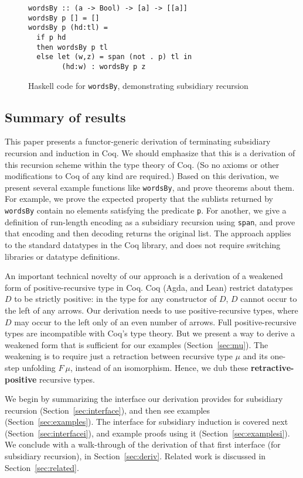 \documentclass[a4paper,USenglish]{lipics-v2021}
\begin{document}
\begin{figure}
\begin{verbatim}
wordsBy :: (a -> Bool) -> [a] -> [[a]]
wordsBy p [] = []
wordsBy p (hd:tl) =
  if p hd
  then wordsBy p tl 
  else let (w,z) = span (not . p) tl in
        (hd:w) : wordsBy p z
\end{verbatim}
\caption{Haskell code for \texttt{wordsBy}, demonstrating subsidiary recursion}
\label{fig:wordsBy}
\end{figure}

\subsection{Summary of results}

This paper presents a functor-generic derivation of terminating
subsidiary recursion and induction in Coq.  We should emphasize that
this is a derivation of this recursion scheme within the type theory
of Coq.  (So no axioms or other modifications to Coq of any kind are
required.) Based on this derivation, we present several example
functions like \verb|wordsBy|, and prove theorems about them.  For
example, we prove the expected property that the sublists returned by
\verb|wordsBy| contain no elements satisfying the predicate \verb|p|.
For another, we give a definition of run-length encoding as a
subsidiary recursion using \verb|span|, and prove that encoding and
then decoding returns the original list.  The approach applies to the
standard datatypes in the Coq library, and does not require switching
libraries or datatype definitions.

An important technical novelty of our approach is a derivation of a
weakened form of positive-recursive type in Coq.  Coq (Agda, and Lean)
restrict datatypes $D$ to be strictly positive: in the type for any
constructor of $D$, $D$ cannot occur to the left of any arrows.  Our
derivation needs to use positive-recursive types, where $D$ may occur
to the left only of an even number of arrows.  Full positive-recursive
types are incompatible with Coq's type theory.  But we present a way
to derive a weakened form that is sufficient for our examples
(Section~\ref{sec:mu}).  The weakening is to require just a retraction
between recursive type $\mu$ and its one-step unfolding $F\ \mu$,
instead of an isomorphism.  Hence, we dub these
\textbf{retractive-positive} recursive types.

We begin by summarizing the interface our derivation provides for
subsidiary recursion (Section~\ref{sec:interface}), and then see
examples (Section~\ref{sec:examples}).  The interface for subsidiary
induction is covered next (Section~\ref{sec:interfacei}), and example
proofs using it (Section~\ref{sec:examplesi}).  We conclude with a
walk-through of the derivation of that first interface (for subsidiary
recursion), in Section~\ref{sec:deriv}.  Related work is discussed in
Section~\ref{sec:related}.
\end{document}
